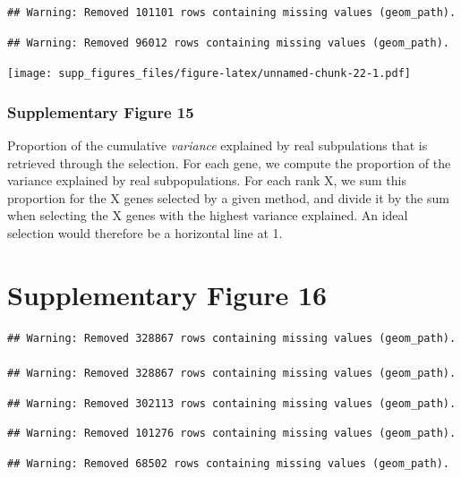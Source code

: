 \documentclass[]{article}
\begin{document}
\begin{verbatim}
## Warning: Removed 101101 rows containing missing values (geom_path).
\end{verbatim}

\begin{verbatim}
## Warning: Removed 96012 rows containing missing values (geom_path).
\end{verbatim}

\texttt{[image: supp\_figures\_files/figure-latex/unnamed-chunk-22-1.pdf]}

\hypertarget{supplementary-figure-15-1}{%
\subsubsection{Supplementary Figure
15}\label{supplementary-figure-15-1}}

Proportion of the cumulative \emph{variance} explained by real
subpulations that is retrieved through the selection. For each gene, we
compute the proportion of the variance explained by real subpopulations.
For each rank X, we sum this proportion for the X genes selected by a
given method, and divide it by the sum when selecting the X genes with
the highest variance explained. An ideal selection would therefore be a
horizontal line at 1.

\newpage

\hypertarget{supplementary-figure-16}{%
\section{Supplementary Figure 16}\label{supplementary-figure-16}}

\begin{verbatim}
## Warning: Removed 328867 rows containing missing values (geom_path).

## Warning: Removed 328867 rows containing missing values (geom_path).
\end{verbatim}

\begin{verbatim}
## Warning: Removed 302113 rows containing missing values (geom_path).
\end{verbatim}

\begin{verbatim}
## Warning: Removed 101276 rows containing missing values (geom_path).
\end{verbatim}

\begin{verbatim}
## Warning: Removed 68502 rows containing missing values (geom_path).
\end{verbatim}
\end{document}
